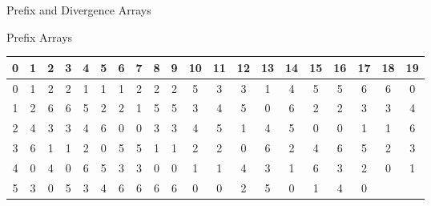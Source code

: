 \documentclass{beamer}
\begin{document}
                    \begin{frame}{Prefix and Divergence Arrays}
                    \begin{block}{Prefix Arrays}
                    \begin{table}[H]
                    \tiny
                    \begin{tabular}{c|c|c|c|c|c|c|c|c|c|c|c|c|c|c|c|c|c|c|c}
                    \hline
                    0 & 1 & 2 & 3 & 4 & 5 & 6 & 7 & 8 & 9 & 10 & 11 & 12 & 13 & 14 & 15 & 16
                                                                                                                                                                                                    & 17 & 18 & 19\\
                    \hline
                    \hline
                    0 & 1 & 2 & 2 & 1 & 1 & 1 & 2 & 2 & 2 & 5 & 3 & 3 & 1 & 4 & 5 & 5 & 6
                                                                                                                                                                                                       & 6 & 0\\  
                    1 & 2 & 6 & 6 & 5 & 2 & 2 & 1 & 5 & 5 & 3 & 4 & 5 & 0 & 6 & 2 & 2 & 3
                                                                                                                                                                                                       & 3 & 4\\  
                    2 & 4 & 3 & 3 & 4 & 6 & 0 & 0 & 3 & 3 & 4 & 5 & 1 & 4 & 5 & 0 & 0 & 1
                                                                                                                                                                                                       & 1 & 6\\  
                    3 & 6 & 1 & 1 & 2 & 0 & 5 & 5 & 1 & 1 & 2 & 2 & 0 & 6 & 2 & 4 & 6 & 5
                                                                                                                                                                                                       & 2 & 3\\  
                    4 & 0 & 4 & 0 & 6 & 5 & 3 & 3 & 0 & 0 & 1 & 1 & 4 & 3 & 1 & 6 & 3 & 2
                                                                                                                                                                                                       & 0 & 1\\  
                    5 & 3 & 0 & 5 & 3 & 4 & 6 & 6 & 6 & 6 & 0 & 0 & 2 & 5 & 0 & 1 & 4 & 0

\end{tabular}
\end{table}
\end{block}
\end{frame}
\end{document}
